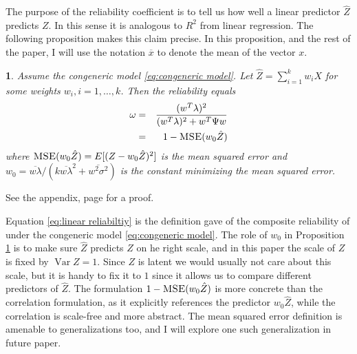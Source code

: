 \documentclass{article}
\makeatletter
\theoremstyle{plain}
\theoremstyle{plain}
\theoremstyle{definition}
\theoremstyle{remark}
\theoremstyle{definition}
\theoremstyle{plain}
\theoremstyle{plain}
\newtheorem{prop}[thm]{\protect\propositionname}
\theoremstyle{definition}
\newenvironment{proof}[1][\protect\proofname]{\par
	\normalfont\topsep6\p@\@plus6\p@\relax
	\trivlist
	\itemindent\parindent
	\item[\hskip\labelsep\scshape #1]\ignorespaces
}{%
	\endtrivlist\@endpefalse
}
\providecommand{\proofname}{Proof}
\providecommand{\propositionname}{Proposition}
\DeclareMathOperator{\Var}{Var}
\DeclareMathOperator{\MSE}{\textsc{MSE}}
\makeatother
\begin{document}
The purpose of the reliability coefficient is to tell us how well a linear predictor $\hat{Z}$ predicts $Z$. In this sense it is analogous to $R^2$ from linear regression. The following proposition makes this claim precise. In this proposition, and the rest of the paper, I will use the notation $\overline{x}$ to denote the mean of the vector $x$.

\begin{prop}
\label{prop:reliability motivation}Assume the congeneric model \eqref{eq:congeneric model}. Let $\hat{Z}=\sum_{i=1}^{k}w_{i}X$
for some weights $w_{i},i=1,\ldots,k$. Then the reliability equals
\begin{eqnarray}
\omega & = & \frac{(w^{T}\lambda)^{2}}{(w^{T}\lambda)^{2}+w^{T}\Psi w}\label{eq:linear reliabiltiy}\\
 & = & 1- \MSE (w_{0}\hat{Z})\nonumber 
\end{eqnarray}
where $\MSE (w_{0}\hat{Z})=E[(Z-w_{0}\hat{Z})^{2}]$ is the
mean squared error and $w_{0}=\overline{w\lambda}/(k\overline{w\lambda}^{2}+\overline{w^{2}\sigma^{2}})$ is the constant minimizing the mean squared error.
\end{prop}
\begin{proof}
See the appendix, page \pageref{proof:reliability motivation} for a proof.
\end{proof}

Equation \eqref{eq:linear reliabiltiy} is the definition \citet[][p. 112]{Joreskog1971-nn} gave of the composite reliability of under the congeneric model \eqref{eq:congeneric model}. The role of $w_0$ in Proposition \ref{prop:reliability motivation} is to make sure $\hat{Z}$ predicts $Z$ on he right scale, and in this paper the scale of $Z$ is fixed by $\Var Z = 1$. Since $Z$ is latent we would usually not care about this scale, but it is handy to fix it to $1$ since it allows us to compare different predictors of $\hat{Z}$. The formulation $1-\MSE (w_{0}\hat{Z})$ is more concrete than the correlation formulation, as it explicitly references the predictor $w_{0}\hat{Z}$, while the correlation is scale-free and more abstract. The mean squared error definition is amenable to generalizations too, and I will explore one such generalization in future paper. 
\end{document}
